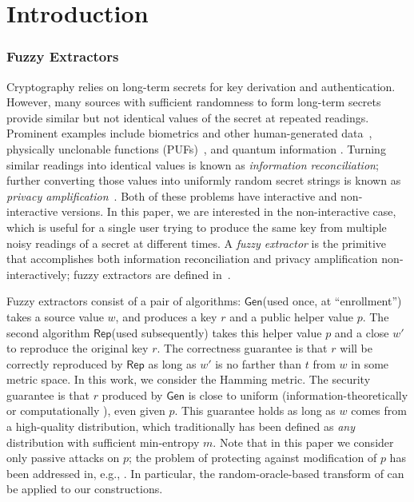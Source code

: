 \documentclass[11pt]{article}
\renewcommand{\paragraph}[1]{\subsubsection{#1}}
\newcommand{\class}[1]{{\ensuremath{\mathsf{#1}}}}
\newcommand{\gen}{\ensuremath{\class{Gen}}\xspace}
\newcommand{\rep}{\ensuremath{\class{Rep}}\xspace}
\begin{document}
\section{Introduction}\label{sec:introduction}

\paragraph{Fuzzy Extractors}
Cryptography relies on long-term secrets for key derivation and authentication. However, many sources with sufficient randomness to form long-term secrets provide similar but not identical values of the secret at repeated readings. Prominent examples include biometrics and other human-generated data~\cite{daugman2004,zviran1993comparison,brostoff2000passfaces,ellison2000protecting,mayrhofer2009shake,monrose2002password},
physically unclonable functions (PUFs)~\cite{pappu2002physical,tuyls2006puf,gassend2002silicon,suh2007physical},
and quantum information \cite{bennett1988privacy}. Turning similar readings into identical values is known as \emph{information reconciliation}; further converting those values into uniformly random secret strings is known as \emph{privacy amplification}~\cite{bennett1988privacy}.
Both of these problems have interactive and non-interactive versions.  In this paper, we are interested in the non-interactive case, which is useful for a single user trying to produce the same key from multiple noisy readings of a secret at different times.
 A \emph{fuzzy extractor} is the primitive that accomplishes both information reconciliation and privacy amplification non-interactively; fuzzy extractors are defined in~\cite{DBLP:journals/siamcomp/DodisORS08}.


Fuzzy extractors consist of a pair of algorithms: \gen (used once, at ``enrollment'') takes a source value $w$, and produces a key $r$ and a public helper value $p$.  The second algorithm \rep (used subsequently) takes this helper value $p$ and a close $w'$ to reproduce the original key $r$.
The correctness guarantee is that $r$ will be correctly reproduced by \rep as long as $w'$ is no farther than $t$ from $w$ in some metric space. In this work, we consider the Hamming metric.
 The security guarantee is that $r$ produced by \gen is close to uniform (information-theoretically \cite{DBLP:journals/siamcomp/DodisORS08} or computationally \cite{fuller2013computational}), even given $p$. This guarantee holds as long as $w$ comes from a high-quality distribution, which
traditionally has been defined as \emph{any} distribution with sufficient min-entropy $m$. Note that in this paper we consider only passive attacks on $p$; the problem of protecting against modification of $p$ has been addressed in, e.g., \cite{Boyen05secureremote,DKKRS12}.  In particular, the random-oracle-based transform of \cite[Theorem 1]{Boyen05secureremote} can be applied to our constructions.
\end{document}
